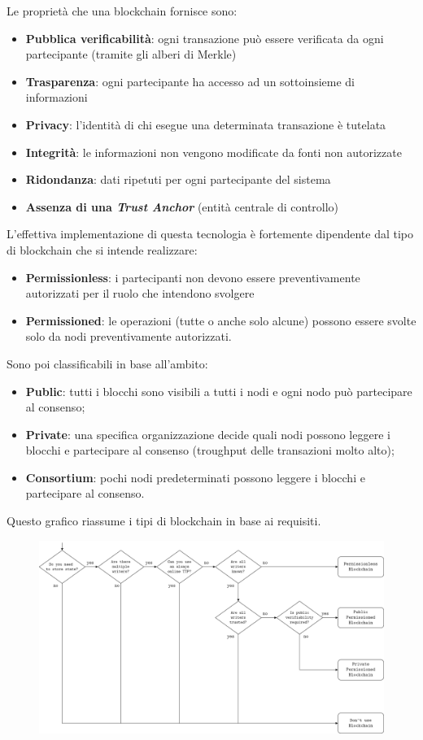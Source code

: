 Le proprietà che una blockchain fornisce sono:
\begin{itemize}
    \item \textbf{Pubblica verificabilità}: ogni transazione può essere verificata da ogni partecipante (tramite gli alberi di Merkle)
    \item \textbf{Trasparenza}: ogni partecipante ha accesso ad un sottoinsieme di informazioni
    \item \textbf{Privacy}: l'identità di chi esegue una determinata transazione è tutelata
    \item \textbf{Integrità}: le informazioni non vengono modificate da fonti non autorizzate
    \item \textbf{Ridondanza}: dati ripetuti per ogni partecipante del sistema
    \item \textbf{Assenza di una \textit{Trust Anchor}} (entità centrale di controllo)
\end{itemize}
L'effettiva implementazione di questa tecnologia è fortemente dipendente dal tipo di blockchain che si intende realizzare:
\begin{itemize}
    \item \textbf{Permissionless}: i partecipanti non devono essere preventivamente autorizzati per il ruolo che intendono svolgere
    \item \textbf{Permissioned}: le operazioni (tutte o anche solo alcune) possono essere svolte solo da nodi preventivamente autorizzati.
\end{itemize}
Sono poi classificabili in base all'ambito:
\begin{itemize}
    \item \textbf{Public}: tutti i blocchi sono visibili a tutti i nodi e ogni nodo può partecipare al consenso;
    \item \textbf{Private}: una specifica organizzazione decide quali nodi possono leggere i blocchi e partecipare al consenso (troughput delle transazioni molto alto);
    \item \textbf{Consortium}: pochi nodi predeterminati possono leggere i blocchi e partecipare al consenso.
\end{itemize}
Questo grafico riassume i tipi di blockchain in base ai requisiti.

\begin{figure}[hbt!]
    \centering
    \includegraphics[width=12cm]{./Images/cap3/3.7.png}
\end{figure}

